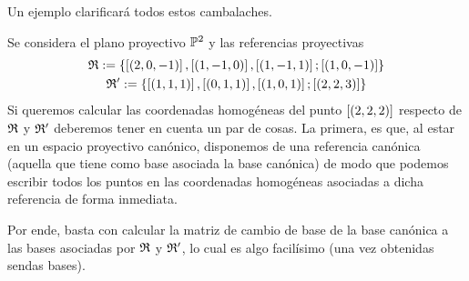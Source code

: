Un ejemplo clarificará todos estos cambalaches.
\begin{exa}
	Se considera el plano proyectivo $\mathbb{P}^2$ y las referencias proyectivas
	\begin{gather*}
		\mathfrak{R}:=\{\left [ (2,0,-1) \right ],\left [ (1,-1,0) \right ],\left [ (1,-1,1) \right ];\left [ (1,0,-1) \right ]\}\\
		\mathfrak{R}':=\{\left [ (1,1,1) \right ],\left [ (0,1,1) \right ],\left [ (1,0,1) \right ];\left [ (2,2,3) \right ]\}
	\end{gather*}
	Si queremos calcular las coordenadas homogéneas del punto $\left [ (2,2,2) \right ]$ respecto de $\mathfrak{R}$ y $\mathfrak{R'}$ deberemos tener en cuenta un par de cosas. La primera, es que, al estar en un espacio proyectivo canónico, disponemos de una referencia canónica (aquella que tiene como base asociada la base canónica) de modo que podemos escribir todos los puntos en las coordenadas homogéneas asociadas a dicha referencia de forma inmediata.
	
	Por ende, basta con calcular la matriz de cambio de base de la base canónica a las bases asociadas por $\mathfrak{R}$ y $\mathfrak{R}'$, lo cual es algo facilísimo (una vez obtenidas sendas bases).
	

\end{exa}
